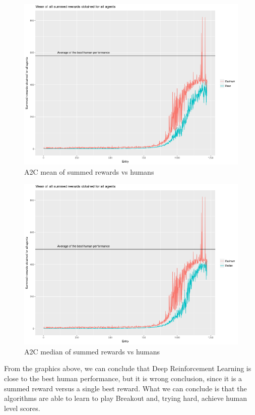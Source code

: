 \documentclass[11pt,twoside,a4paper]{article}
\begin{document}
\begin{figure}[H]
  \includegraphics[scale=0.35]{log-analysis/a2c-vs-humans-mean.png}
  \centering
  \caption{A2C mean of summed rewards vs humans}
  \label{fig:a2c-vs-humans-mean}
\end{figure}

\begin{figure}[H]
  \includegraphics[scale=0.35]{log-analysis/a2c-vs-humans-median.png}
  \centering
  \caption{A2C median of summed rewards vs humans}
  \label{fig:a2c-vs-humans-median}
\end{figure}

From the graphics above, we can conclude that Deep Reinforcement Learning is
close to the best human performance, but it is wrong conclusion, since it is a
summed reward versus a single best reward. What we can conclude is that the
algorithms are able to learn to play Breakout and, trying hard, achieve human
level scores.
\end{document}
